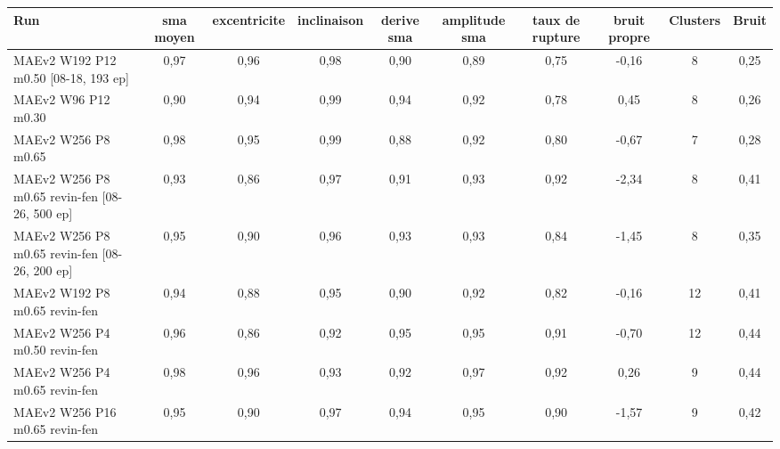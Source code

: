 \begin{tabular}{lccccccccc}
\toprule
Run & sma moyen & excentricite & inclinaison & derive sma & amplitude sma & taux de rupture & bruit propre & Clusters & Bruit \\
\midrule
MAEv2 W192 P12 m0.50 [08-18, 193 ep] & 0,97 & 0,96 & 0,98 & 0,90 & 0,89 & 0,75 & -0,16 & 8 & 0,25 \\
MAEv2 W96 P12 m0.30 & 0,90 & 0,94 & 0,99 & 0,94 & 0,92 & 0,78 & 0,45 & 8 & 0,26 \\
MAEv2 W256 P8 m0.65 & 0,98 & 0,95 & 0,99 & 0,88 & 0,92 & 0,80 & -0,67 & 7 & 0,28 \\
MAEv2 W256 P8 m0.65 revin-fen [08-26, 500 ep] & 0,93 & 0,86 & 0,97 & 0,91 & 0,93 & 0,92 & -2,34 & 8 & 0,41 \\
MAEv2 W256 P8 m0.65 revin-fen [08-26, 200 ep] & 0,95 & 0,90 & 0,96 & 0,93 & 0,93 & 0,84 & -1,45 & 8 & 0,35 \\
MAEv2 W192 P8 m0.65 revin-fen & 0,94 & 0,88 & 0,95 & 0,90 & 0,92 & 0,82 & -0,16 & 12 & 0,41 \\
MAEv2 W256 P4 m0.50 revin-fen & 0,96 & 0,86 & 0,92 & 0,95 & 0,95 & 0,91 & -0,70 & 12 & 0,44 \\
MAEv2 W256 P4 m0.65 revin-fen & 0,98 & 0,96 & 0,93 & 0,92 & 0,97 & 0,92 & 0,26 & 9 & 0,44 \\
MAEv2 W256 P16 m0.65 revin-fen & 0,95 & 0,90 & 0,97 & 0,94 & 0,95 & 0,90 & -1,57 & 9 & 0,42 \\
\bottomrule
\end{tabular}
